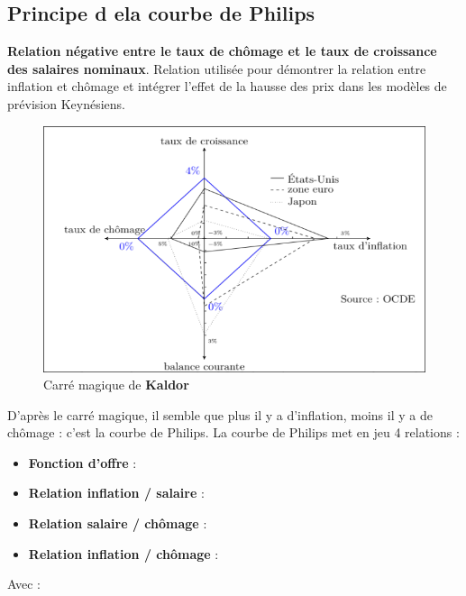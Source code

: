 \subsection{Principe d ela courbe de Philips}
\textbf{Relation négative entre le taux de chômage et le taux de croissance des salaires nominaux}. Relation utilisée pour démontrer la relation entre inflation et chômage et intégrer l'effet de la hausse des prix dans les modèles de prévision Keynésiens.
\begin{figure}[hbt!]
    \includegraphics[scale=0.5]{Pics/Carre_magique.png}
    \caption{Carré magique de \textbf{Kaldor}}
\end{figure}
\newline
D'après le carré magique, il semble que plus il y a d'inflation, moins il y a de chômage : c'est la courbe de Philips.
\newpage
La courbe de Philips met en jeu 4 relations :
\begin{itemize}
    \item \textbf{Fonction d'offre} : \Large{}
    \item \textbf{Relation inflation / salaire} : \Large{}
    \item \textbf{Relation salaire / chômage} : \Large{}
    \item \textbf{Relation inflation / chômage} : \Large{}
\end{itemize}
Avec : 
